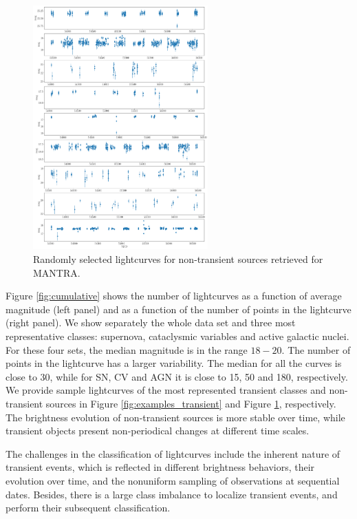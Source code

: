 \documentclass{aastex62}
\begin{document}
\begin{figure}
  \includegraphics[width=0.6\textwidth]{examples_nontransient.pdf}
  \caption{Randomly selected lightcurves for non-transient sources retrieved for MANTRA.}
  \label{fig:examples_non_transient}
\end{figure} 

Figure \ref{fig:cumulative} shows the number of lightcurves as a
function of average magnitude (left panel) and as a function of the
number of points in the lightcurve (right panel).
We show separately the whole data set and three most representative
classes: supernova, cataclysmic variables and active galactic nuclei. 
For these four sets, the median magnitude is in the range $18-20$. 
The number of points in the lightcurve has a larger variability.
The median for all the curves is close to 30, while for SN, CV and
AGN it is close to 15, 50 and 180, respectively. 
We provide sample lightcurves of the most represented transient classes 
and non-transient sources in Figure \ref{fig:examples_transient} and Figure \ref{fig:examples_non_transient}, respectively. 
The brightness evolution of non-transient sources is more stable over time, 
while transient objects present non-periodical changes at different time scales. 

The challenges in the classification of lightcurves 
include the inherent nature of transient events, which is reflected 
in different brightness behaviors, their evolution over time, and 
the nonuniform sampling of observations at sequential dates. 
Besides, there is a large class imbalance to localize transient events, 
and perform their subsequent classification. 
\end{document}
